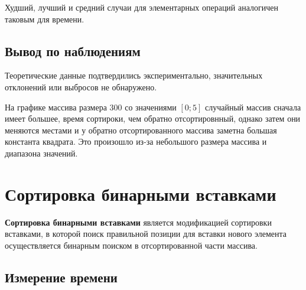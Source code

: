 \documentclass[11pt]{article}
\begin{document}
\begin{center}
\end{center}
{ \hspace*{\fill} }

Худший, лучший и средний случаи для элементарных операций аналогичен таковым для времени.

\subsection{Вывод по наблюдениям}

Теоретические данные подтвердились экспериментально, значительных отклонений или выбросов не обнаружено.

На графике массива размера 300 со значениями $\left[0;5\right]$ случайный массив
сначала имеет большее, время сортироки, чем обратно отсортировнный, однако затем они меняются местами и у
обратно отсортированного массива заметна большая константа квадрата. Это произошло из-за небольшого размера массива
и диапазона значений.

\newpage

\setcounter{section}{6}
\section*{\centering Сортировка бинарными вставками}

\textbf{Сортировка бинарными вставками} является модификацией сортировки вставками, в
которой поиск правильной позиции для вставки нового элемента осуществляется бинарным поиском в отсортированной части массива.

\setcounter{subsection}{0}
\subsection{Измерение времени}

\begin{center}
\end{center}
{ \hspace*{\fill} }

\begin{center}
\end{center}
{ \hspace*{\fill} }
\end{document}

